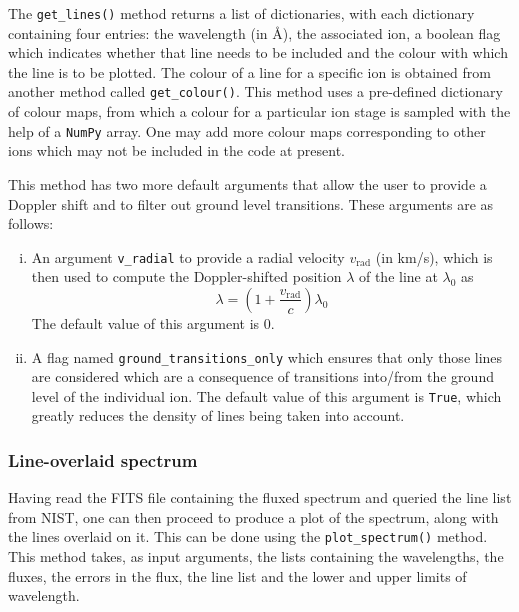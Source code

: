                 The \texttt{get\_lines()} method  returns a list of dictionaries, with each dictionary containing four entries: the wavelength (in \AA), the associated ion, a boolean flag which indicates whether that line needs to be included and the colour with which the line is to be plotted. The colour of a line for a specific ion is obtained from another method called \texttt{get\_colour()}. This method uses a pre-defined dictionary of colour maps, from which a colour for a particular ion stage is sampled with the help of a \texttt{NumPy} array. One may add more colour maps corresponding to other ions which may not be included in the code at present.
                
                This method has two more default arguments that allow the user to provide a Doppler shift and to filter out ground level transitions. These arguments are as follows:
                
                \begin{enumerate}[i.]
                    \item An argument \texttt{v\_radial} to provide a radial velocity $v_\text{rad}$ (in km/s), which is then used to compute the Doppler-shifted position $\lambda$ of the line at $\lambda_0$ as
                    \begin{equation}
                        \lambda=\left( 1+\dfrac{v_\text{rad}}{c} \right)\lambda_0 \label{eqn-doppler-shift}
                    \end{equation}
                    The default value of this argument is 0.
                    
                    \item A flag named \texttt{ground\_transitions\_only} which ensures that only those lines are considered which are a consequence of transitions into/from the ground level of the individual ion. The default value of this argument is \texttt{True}, which greatly reduces the density of lines being taken into account.
                \end{enumerate}
            
            \subsubsection{Line-overlaid spectrum} \label{tool:rgs-files:demonstration:lineoverlay}
                Having read the FITS file containing the fluxed spectrum and queried the line list from NIST, one can then proceed to produce a plot of the spectrum, along with the lines overlaid on it. This can be done using the \texttt{plot\_spectrum()} method. This method takes, as input arguments, the lists containing the wavelengths, the fluxes, the errors in the flux, the line list and the lower and upper limits of wavelength.
                
